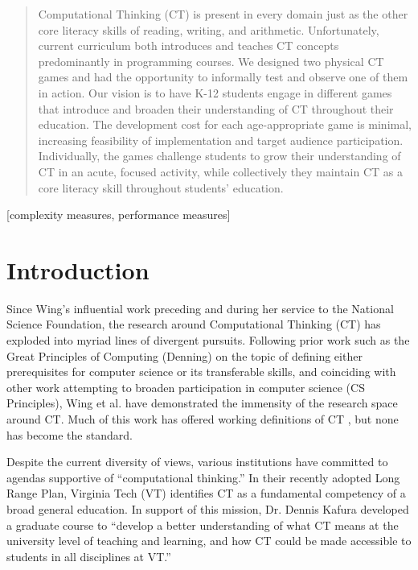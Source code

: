 \documentclass{acm_proc_article-sp}
\begin{document}
\maketitle
\begin{abstract}
Computational Thinking (CT) is present in every domain just as the other core literacy skills of reading, writing, and arithmetic. Unfortunately, current curriculum both introduces and teaches CT concepts predominantly in programming courses. We designed two physical CT games and had the opportunity to informally test and observe one of them in action. Our vision is to have K-12 students engage in different games that introduce and broaden their understanding of CT throughout their education. The development cost for each age-appropriate game is minimal, increasing feasibility of implementation and target audience participation. Individually, the games challenge students to grow their understanding of CT in an acute, focused activity, while collectively they maintain CT as a core literacy skill throughout students’ education.
\end{abstract}

[complexity measures, performance measures]



\section{Introduction}
Since Wing’s influential work preceding and during her service to the National Science Foundation, the research around Computational Thinking (CT) has exploded into myriad lines of divergent pursuits. Following prior work such as the Great Principles of Computing (Denning) on the topic of defining either prerequisites for computer science or its transferable skills, and coinciding with other work attempting to broaden participation in computer science (CS Principles), Wing et al. have demonstrated the immensity of the research space around CT. Much of this work has offered working definitions of CT   , but none has become the standard.

Despite the current diversity of views, various institutions have committed to agendas supportive of “computational thinking.” In their recently adopted Long Range Plan, Virginia Tech (VT) identifies CT as a fundamental competency of a broad general education. In support of this mission, Dr. Dennis Kafura developed a graduate course to “develop a better understanding of what CT means at the university level of teaching and learning, and how CT could be made accessible to students in all disciplines at VT.”
\end{document}
